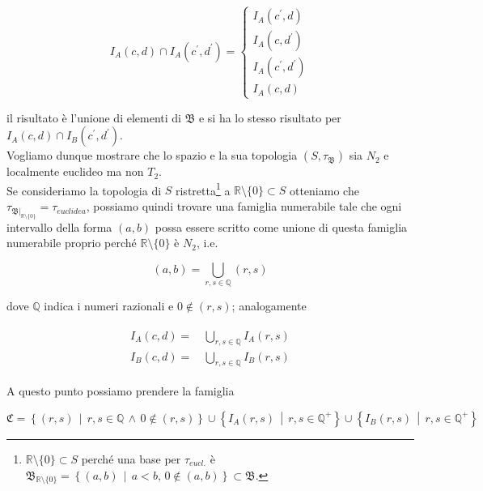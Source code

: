 \begin{equation}
	I_{A}(c,d) \cap I_{A}(c^{\prime},d^{\prime}) =%
		\begin{cases}
			I_{A}(c^{\prime},d)\\
			I_{A}(c,d^{\prime})\\
			I_{A}(c^{\prime},d^{\prime})\\
			I_{A}(c,d)
		\end{cases}
\end{equation}

il risultato è l'unione di elementi di $ \mathfrak{B} $ e si ha lo stesso risultato per $ I_{A}(c,d) \cap I_{B}(c^{\prime},d^{\prime}) $.\\
Vogliamo dunque mostrare che lo spazio e la sua topologia $ (S,\tau_{\mathfrak{B}}) $ sia $ N_{2} $ e localmente euclideo ma non $ T_{2} $.\\
Se consideriamo la topologia di $ S $ ristretta\footnote{%
	$ \mathbb{R} \setminus \{0\} \subset S $ perché una base per $ \tau_{eucl.} $ è $ \mathfrak{B}_{\mathbb{R} \setminus \{0\}} = \left\{ (a,b) \, \middle| \, a<b, \, 0 \notin (a,b) \right\} \subset \mathfrak{B} $.%
} a $ \mathbb{R} \setminus \{0\} \subset S $ otteniamo che $ \tau_{\left. \mathfrak{B} \right|_{\mathbb{R} \setminus \{0\}}} = \tau_{euclidea} $, possiamo quindi trovare una famiglia numerabile tale che ogni intervallo della forma $ (a,b) $ possa essere scritto come unione di questa famiglia numerabile proprio perché $ \mathbb{R} \setminus \{0\} $ è $ N_{2} $, i.e.

\begin{equation}
	(a,b) = \bigcup_{r,s \in \mathbb{Q}} (r,s)
\end{equation}

dove $ \mathbb{Q} $ indica i numeri razionali e $ 0 \notin (r,s) $; analogamente

\begin{align}
	\begin{split}
		I_{A}(c,d) =& \, \bigcup_{r,s \in \mathbb{Q}} I_{A}(r,s)\\
		I_{B}(c,d) =& \, \bigcup_{r,s \in \mathbb{Q}} I_{B}(r,s)
	\end{split}
\end{align}

A questo punto possiamo prendere la famiglia

\begin{equation}
	\mathfrak{C} = \left\{ (r,s) \, \middle| \, r,s \in \mathbb{Q} \, \wedge \, 0 \notin (r,s) \right\} \cup \left\{ I_{A}(r,s) \, \middle| \, r,s \in \mathbb{Q}^{+} \right\} \cup \left\{ I_{B}(r,s) \, \middle| \, r,s \in \mathbb{Q}^{+} \right\}
\end{equation}

